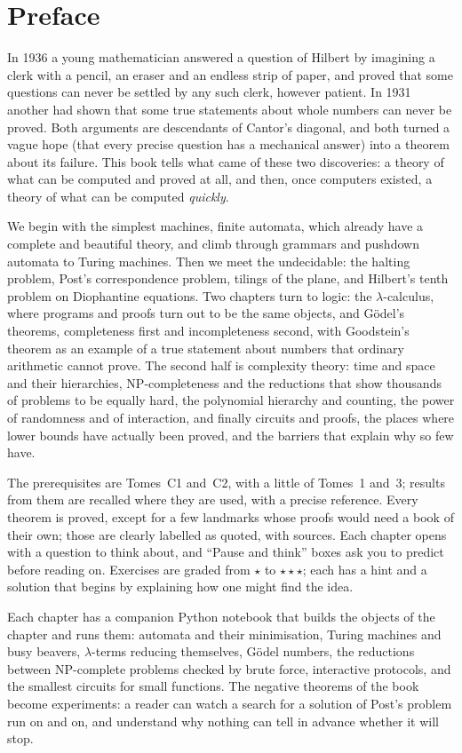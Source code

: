 \chapter*{Preface}

In 1936 a young mathematician answered a question of Hilbert by imagining a clerk with a pencil, an eraser and an
endless strip of paper, and proved that some questions can never be settled by any such clerk, however patient. In
1931 another had shown that some true statements about whole numbers can never be proved. Both arguments are
descendants of Cantor's diagonal, and both turned a vague hope (that every precise question has a mechanical answer)
into a theorem about its failure. This book tells what came of these two discoveries: a theory of what can be
computed and proved at all, and then, once computers existed, a theory of what can be computed \emph{quickly}.

We begin with the simplest machines, finite automata, which already have a complete and beautiful theory, and climb
through grammars and pushdown automata to Turing machines. Then we meet the undecidable: the halting problem,
Post's correspondence problem, tilings of the plane, and Hilbert's tenth problem on Diophantine equations. Two
chapters turn to logic: the $\lambda$-calculus, where programs and proofs turn out to be the same objects, and
G\"odel's theorems, completeness first and incompleteness second, with Goodstein's theorem as an example of a true
statement about numbers that ordinary arithmetic cannot prove. The second half is complexity theory: time and space
and their hierarchies, NP-completeness and the reductions that show thousands of problems to be equally hard, the
polynomial hierarchy and counting, the power of randomness and of interaction, and finally circuits and proofs, the
places where lower bounds have actually been proved, and the barriers that explain why so few have.

The prerequisites are Tomes~C1 and~C2, with a little of Tomes~1 and~3; results from them are recalled where they are
used, with a precise reference. Every theorem is proved, except for a few landmarks whose proofs would need a book
of their own; those are clearly labelled as quoted, with sources. Each chapter opens with a question to think about,
and ``Pause and think'' boxes ask you to predict before reading on. Exercises are graded from $\star$ to
$\star\star\star$; each has a hint and a solution that begins by explaining how one might find the idea.

Each chapter has a companion Python notebook that builds the objects of the chapter and runs them: automata and
their minimisation, Turing machines and busy beavers, $\lambda$-terms reducing themselves, G\"odel numbers, the
reductions between NP-complete problems checked by brute force, interactive protocols, and the smallest circuits
for small functions. The negative theorems of the book become experiments: a reader can watch a search for a
solution of Post's problem run on and on, and understand why nothing can tell in advance whether it will stop.
